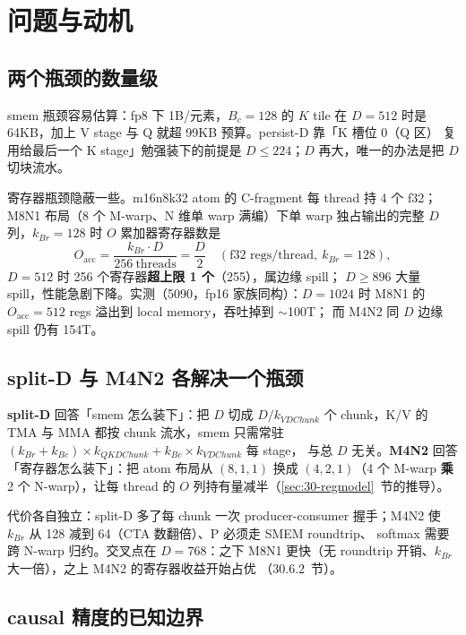 \section{问题与动机}

\subsection{两个瓶颈的数量级}

smem 瓶颈容易估算：fp8 下 1B/元素，$B_c=128$ 的 $K$ tile 在 $D=512$ 时是
64KB，加上 V stage 与 Q 就超 99KB 预算。persist-D 靠「K 槽位 0（Q 区）
复用给最后一个 K stage」勉强装下的前提是 $D\le 224$；$D$ 再大，唯一的办法是把 $D$ 切块流水。

寄存器瓶颈隐蔽一些。m16n8k32 atom 的 C-fragment 每 thread 持 4 个 f32；
M8N1 布局（8 个 M-warp、N 维单 warp 满编）下单 warp 独占输出的完整 $D$
列，$k_{Br}=128$ 时 $O$ 累加器寄存器数是
\begin{equation}\label{eq:30-oacc-m8n1}
O_{\text{acc}}=\frac{k_{Br}\cdot D}{256\ \text{threads}}=\frac{D}{2}
\quad(\text{f32 regs/thread},\ k_{Br}=128),
\end{equation}
$D=512$ 时 256 个寄存器\textbf{超上限 1 个}（255），属边缘 spill；
$D\ge 896$ 大量 spill，性能急剧下降。实测（5090，fp16 家族同构）：$D=1024$ 时 M8N1 的
$O_{\text{acc}}=512$ regs 溢出到 local memory，吞吐掉到 $\sim$100T；
而 M4N2 同 $D$ 边缘 spill 仍有 154T。

\subsection{split-D 与 M4N2 各解决一个瓶颈}

\textbf{split-D} 回答「smem 怎么装下」：把 $D$ 切成 $D/k_{VDChunk}$ 个
chunk，K/V 的 TMA 与 MMA 都按 chunk 流水，smem 只需常驻
$(k_{Br}+k_{Bc})\times k_{QKDChunk}+k_{Bc}\times k_{VDChunk}$ 每 stage，
与总 $D$ 无关。\textbf{M4N2} 回答「寄存器怎么装下」：把 atom 布局从
$(8,1,1)$ 换成 $(4,2,1)$（4 个 M-warp \textbf{乘} 2 个 N-warp），让每
thread 的 $O$ 列持有量减半（\ref{sec:30-regmodel}~节的推导）。

代价各自独立：split-D 多了每 chunk 一次 producer-consumer 握手；M4N2
使 $k_{Br}$ 从 128 减到 64（CTA 数翻倍）、P 必须走 SMEM roundtrip、
softmax 需要跨 N-warp 归约。交叉点在 $D=768$：之下 M8N1 更快（无
roundtrip 开销、$k_{Br}$ 大一倍），之上 M4N2 的寄存器收益开始占优
（30.6.2~节）。

\subsection{causal 精度的已知边界}

